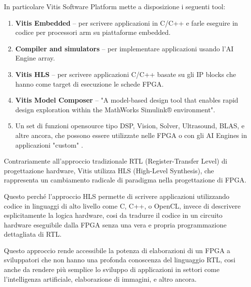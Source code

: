 \vspace{0.4cm}

\noindent In particolare Vitis Software Platform mette a disposizione i seguenti tool:

\begin{enumerate}
    \item \textbf{Vitis Embedded} – per scrivere applicazioni in C/C++ e farle eseguire in codice per processori arm su piattaforme embedded.
    \item \textbf{Compiler and simulators} – per implementare applicazioni usando l'AI Engine array.
    \item \textbf{Vitis HLS} – per scrivere applicazioni C/C++ basate su gli IP blocks che hanno come target di esecuzione le schede FPGA.
    \item \textbf{Vitis Model Composer} – "A model-based design tool that enables rapid design exploration within the MathWorks Simulink® environment"\cite{sitoAMDvitis}.
    \item Un set di funzioni opensource tipo  DSP, Vision, Solver, Ultrasound, BLAS, e altre ancora, che possono essere utilizzate nelle FPGA o con gli AI Engines in applicazioni "custom" .
\end{enumerate}

\vspace{0.3cm}
\noindent Contrariamente all'approccio tradizionale RTL (Register-Transfer Level) di progettazione hardware, Vitis utilizza HLS (High-Level Synthesis), che rappresenta un cambiamento radicale di paradigma  nella progettazione di FPGA.

\vspace{0.3cm}

\noindent Questo perché l'approccio HLS permette di scrivere applicazioni utilizzando codice in linguaggi di alto livello come C, C++, o OpenCL, invece di descrivere esplicitamente la logica hardware, cosi da tradurre il codice in un circuito hardware eseguibile dalla FPGA senza una vera e propria programmazione dettagliata di RTL.

\vspace{0.3cm}

\noindent Questo approccio rende accessibile la potenza di elaborazioni di un FPGA a sviluppatori che non hanno una profonda conoscenza del linguaggio RTL, cosi anche da rendere più semplice lo sviluppo di applicazioni in settori come l'intelligenza artificiale, elaborazione di immagini, e altro ancora.

\clearpage 

